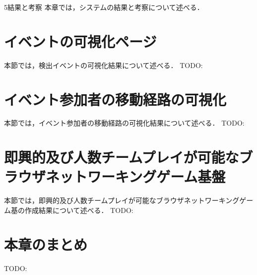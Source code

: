 \chapterhead
{5}{結果と考察}
{本章では，システムの結果と考察について述べる．}

\newpage
\section{イベントの可視化ページ}
本節では，検出イベントの可視化結果について述べる．
TODO:

\section{イベント参加者の移動経路の可視化}
本節では，イベント参加者の移動経路の可視化結果について述べる．
TODO:

\section{即興的及び人数チームプレイが可能なブラウザネットワーキングゲーム基盤}
本節では，即興的及び人数チームプレイが可能なブラウザネットワーキングゲーム基の作成結果について述べる．
TODO:

\newpage

\section{本章のまとめ}
TODO:

\newpage
